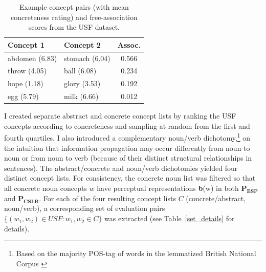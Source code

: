  \begin{table}[t]\begin{center}\begin{tabular}{l|l|c}



\bf Concept 1 & \bf Concept 2 & \bf Assoc. \\
 \hline 
abdomen \footnotesize{ (6.83)} & stomach \footnotesize{ (6.04)} & 0.566 \\
throw \footnotesize{  (4.05)} & ball  \footnotesize{ (6.08)} & 0.234 \\
hope \footnotesize{  (1.18)} & glory \footnotesize{ (3.53)} & 0.192 \\
egg \footnotesize{ (5.79)} & milk \footnotesize{ (6.66)} & 0.012 \\



\end{tabular}\end{center}\caption{\label{font-table} Example concept pairs (with mean concreteness rating) and free-association scores from the USF dataset.}\end{table}






I created separate abstract and concrete concept lists by ranking the USF concepts according to concreteness and sampling at random from the first and fourth quartiles. I also introduced a complementary noun/verb dichotomy,\footnote{Based on the majority POS-tag of words in the lemmatized British National Corpus \citep{leech1994claws4}} on the intuition that information propagation may occur differently from noun to noun or from noun to verb (because of their distinct structural relationships in sentences). The abstract/concrete and noun/verb dichotomies yielded four distinct concept lists. For consistency, the concrete noun list was filtered so that all concrete noun concepts \(w\) have perceptual representations {\bf b}(w) in both  \(\mathbf{P_{ESP}}\) and  \(\mathbf{P_{CSLB}}\). For each of the four resulting concept lists \(C\) (concrete/abstract, noun/verb), a corresponding set of evaluation pairs  \( \{ (w_1, w_2) \in USF :  w_1, w_2 \in C\}\) was extracted (see Table~\ref{set_details} for details). 



